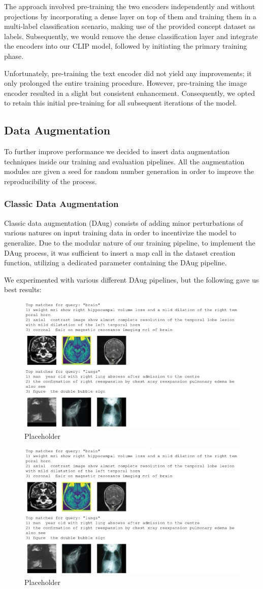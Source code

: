 \documentclass[10pt,twocolumn,letterpaper]{article}
\begin{document}
The approach involved pre-training the two encoders independently and without projections by incorporating a dense layer on top of them and training them in a multi-label classification scenario, making use of the provided concept dataset as labels. Subsequently, we would remove the dense classification layer and integrate the encoders into our CLIP model, followed by initiating the primary training phase.

Unfortunately, pre-training the text encoder did not yield any improvements; it only prolonged the entire training procedure. However, pre-training the image encoder resulted in a slight but consistent enhancement. Consequently, we opted to retain this initial pre-training for all subsequent iterations of the model.

\subsection{Data Augmentation}
To further improve performance we decided to insert data augmentation techniques inside our training and evaluation pipelines.
All the augmentation modules are given a seed for random number generation in order to improve the reproducibility of the process.

\subsubsection{Classic Data Augmentation}
Classic data augmentation (DAug) consists of adding minor perturbations of various natures on input training data in order to incentivize the model to generalize.
Due to the modular nature of our training pipeline, to implement the DAug process, it was sufficient to insert a map call in the dataset creation function, utilizing a dedicated parameter containing the DAug pipeline.

We experimented with various different DAug pipelines, but the following gave us best results:
\begin{figure}[H]
   \centering
   \includegraphics[width=0.5\linewidth]{img/T2I_test1.png}
   \caption{Placeholder}
\end{figure}
\begin{figure}[H]
   \centering
   \includegraphics[width=0.5\linewidth]{img/T2I_test1.png}
   \caption{Placeholder}
\end{figure}
\end{document}
